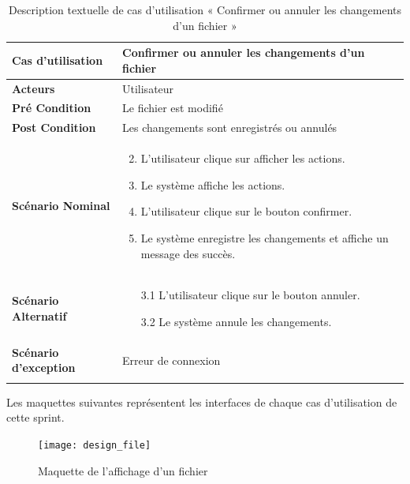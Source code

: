 \begin{longtable}{|p{5cm}|p{10cm}|}
\hline
\textbf{Cas d'utilisation}&Confirmer ou annuler les changements d'un fichier\\
\hline
\textbf{Acteurs}&Utilisateur\\
\hline
\textbf{Pré Condition}&Le fichier est modifié\\
\hline
\textbf{Post Condition}&Les changements sont enregistrés ou annulés\\
\hline
\textbf{Scénario Nominal}&
\vspace{-\baselineskip}
\begin{enumerate}
    \setcounter{enumi}{1}
    \item L'utilisateur clique sur afficher les actions.
    \item Le système affiche les actions.
    \item L'utilisateur clique sur le bouton confirmer.
    \item Le système enregistre les changements et affiche un message des succès.
\end{enumerate}\\
\hline
\textbf{Scénario Alternatif}&
\vspace{-\baselineskip}
\begin{enumerate}
    \item [3.1]L'utilisateur clique sur le bouton annuler.
    \item [3.2]Le système annule les changements.
\end{enumerate}\\
\hline
\textbf{Scénario d'exception}&Erreur de connexion\\
\hline
\caption{Description textuelle de cas d'utilisation « Confirmer ou annuler les changements d'un fichier »}
\label{tab:description-textuelle-de-cas-d-utilisation-confirmer-ou-annuler-les-changements-d-un-fichier}
\end{longtable}


Les maquettes suivantes représentent les interfaces de chaque cas d'utilisation de cette sprint. \\

\begin{figure}[H]
  \centering
  \texttt{[image: design\_file]}
  \caption{Maquette de l'affichage d'un fichier}
  \label{fig:design_file_preview}
\end{figure}

